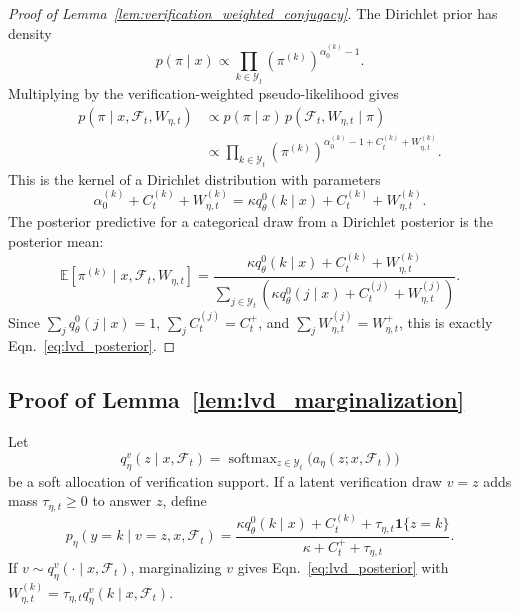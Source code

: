 \documentclass{article}
\newcommand{\eqnref}[1]{Eqn.~\eqref{#1}}
\newcommand{\lemref}[1]{Lemma~\ref{#1}}
\begin{document}
\begin{proof}[Proof of \lemref{lem:verification_weighted_conjugacy}]
The Dirichlet prior has density
\[
    p(\pi\mid x)
    \propto
    \prod_{k\in\mathcal Y_t}
    \left(\pi^{(k)}\right)^{\alpha_0^{(k)}-1}.
\]
Multiplying by the verification-weighted pseudo-likelihood gives
\[
\begin{aligned}
    p(\pi\mid x,\mathcal F_t,W_{\eta,t})
    &\propto
    p(\pi\mid x)\,
    p(\mathcal F_t,W_{\eta,t}\mid \pi)\\
    &\propto
    \prod_{k\in\mathcal Y_t}
    \left(\pi^{(k)}\right)^{
    \alpha_0^{(k)}-1+C_t^{(k)}+W_{\eta,t}^{(k)}
    }.
\end{aligned}
\]
This is the kernel of a Dirichlet distribution with parameters
\[
    \alpha_0^{(k)}+C_t^{(k)}+W_{\eta,t}^{(k)}
    =
    \kappa q_\theta^0(k\mid x)+C_t^{(k)}+W_{\eta,t}^{(k)}.
\]
The posterior predictive for a categorical draw from a Dirichlet posterior is
the posterior mean:
\[
    \mathbb E[\pi^{(k)}\mid x,\mathcal F_t,W_{\eta,t}]
    =
    \frac{
    \kappa q_\theta^0(k\mid x)+C_t^{(k)}+W_{\eta,t}^{(k)}
    }{
    \sum_{j\in\mathcal Y_t}
    \left(\kappa q_\theta^0(j\mid x)+C_t^{(j)}+W_{\eta,t}^{(j)}\right)
    }.
\]
Since $\sum_j q_\theta^0(j\mid x)=1$,
$\sum_j C_t^{(j)}=C_t^+$, and
$\sum_j W_{\eta,t}^{(j)}=W_{\eta,t}^+$, this is exactly
\eqnref{eq:lvd_posterior}.
\end{proof}

\subsection{Proof of \lemref{lem:lvd_marginalization}}
\label{app:proof_lvd_marginalization}

\begin{lemma}
\label{lem:lvd_marginalization}
Let
\begin{equation}
    q_\eta^v(z\mid x,\mathcal F_t)
    =
    \operatorname{softmax}_{z\in\mathcal Y_t}
    \bigl(a_\eta(z;x,\mathcal F_t)\bigr)
    \label{eq:verification_direction}
\end{equation}
be a soft allocation of verification support. If a latent verification draw
$v=z$ adds mass $\tau_{\eta,t}\ge 0$ to answer $z$, define
\begin{equation}
    p_\eta(y=k\mid v=z,x,\mathcal F_t)
    =
    \frac{
    \kappa q_\theta^0(k\mid x)+C_t^{(k)}
    +\tau_{\eta,t}\mathbf 1\{z=k\}
    }{
    \kappa+C_t^+ +\tau_{\eta,t}
    }.
    \label{eq:lvd_conditional}
\end{equation}
If $v\sim q_\eta^v(\cdot\mid x,\mathcal F_t)$, marginalizing $v$ gives
\eqnref{eq:lvd_posterior} with
$W_{\eta,t}^{(k)}=\tau_{\eta,t}q_\eta^v(k\mid x,\mathcal F_t)$.
\end{lemma}
\end{document}
